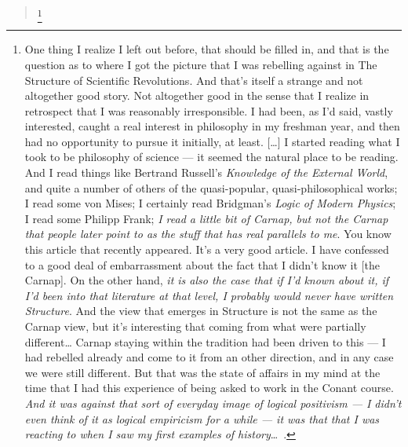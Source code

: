 \begin{quote}
	 \footnote{One thing I realize I left out before, that should be filled in, and that is the question as to where I got the picture that I was rebelling against in The Structure of Scientific Revolutions. And that's itself a strange and not altogether good story. Not altogether good in the sense that I realize in retrospect that I was reasonably irresponsible. I had been, as I'd said, vastly interested, caught a real interest in philosophy in my freshman year, and then had no opportunity to pursue it initially, at least. [\ldots] I started reading what I took to be philosophy of science --- it seemed the natural place to be reading. And I read things like Bertrand Russell's \emph{Knowledge of the External World}, and quite a number of others of the quasi-popular, quasi-philosophical works; I read some von Mises; I certainly read Bridgman's \emph{Logic of Modern Physics}; I read some Philipp Frank; \emph{I read a little bit of Carnap, but not the Carnap that people later point to as the stuff that has real parallels to me}. You know this article that recently appeared. It's a very good article. I have confessed to a good deal of embarrassment about the fact that I didn't know it [the Carnap]. On the other hand, \emph{it is also the case that if I'd known about it, if I'd been into that literature at that level, I probably would never have written Structure}. And the view that emerges in Structure is not the same as the Carnap view, but it's interesting that coming from what were partially different{\ldots} Carnap staying within the tradition had been driven to this --- I had rebelled already and come to it from an other direction, and in any case we were still different. But that was the state of affairs in my mind at the time that I had this experience of being asked to work in the Conant course. \emph{And it was against that sort of everyday image of logical positivism --- I didn't even think of it as logical empiricism for a while --- it was that that I was reacting to when I saw my first examples of history}\ldots~\citep[pp. 305--306]{KUHN1995}.}

\end{quote}


